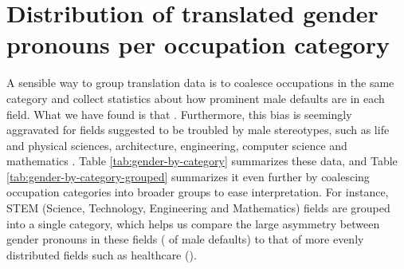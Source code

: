 \documentclass[fleqn,10pt]{article}
\begin{document}
\section{Distribution of translated gender pronouns per occupation category}

A sensible way to group translation data is to coalesce occupations in the same category and collect statistics  about how prominent male defaults are in each field. What we have found is that . Furthermore, this bias is seemingly aggravated for fields suggested to be troubled by male stereotypes, such as life and physical sciences, architecture, engineering, computer science and mathematics \citep{moss2015can}. Table \ref{tab:gender-by-category} summarizes these data, and Table \ref{tab:gender-by-category-grouped} summarizes it even further by coalescing occupation categories into broader groups to ease interpretation. For instance, STEM (Science, Technology, Engineering and Mathematics) fields are grouped into a single category, which helps us compare the large asymmetry between gender pronouns in these fields ( of male defaults) to that of more evenly distributed fields such as healthcare ().
\end{document}
